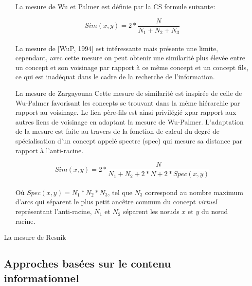 \begin{appendices}
\begin{itemize}
    La mesure de Wu et Palmer est définie par la CS formule suivante:
  
    \begin{equation}
      \label{wu_palmer}
      Sim(x,y) = 2 *  \frac{N}{N_{1} + N_{2} + N_{3}}
    \end{equation}\\

    La mesure de [WuP, 1994] est intéressante mais présente une
    limite, cependant, avec cette mesure on peut obtenir une
    similarité plus élevée entre un concept et son voisinage par
    rapport à ce même concept et un concept fils, ce qui est inadéquat
    dans le cadre de la recherche de l’information.\\

  \item [La mesure de Zargayouna]
    Cette mesure de similarité est inspirée de celle de Wu-Palmer
    favorisant les concepts se trouvant dans la même hiérarchie par
    rapport au voisinage. Le lien père-fils est ainsi privilégié xpar
    rapport aux autres liens de voisinage en adaptant la mesure de
    Wu-Palmer. L'adaptation de la mesure est faite au travers de la
    fonction de calcul du degré de spécialisation d'un concept appelé
    spectre (spec) qui mesure sa distance par rapport à l'anti-racine.

    \begin{equation}
      \label{zargayouna}
      Sim(x,y)= 2 * \frac{N}{N_{1} + N_{2} + 2 * N + 2 * Spec(x,y)}
    \end{equation}\\
      
    Où $Spec(x,y)=N_{1}*N_{2} *N_{3}$, tel que $N_{3}$ correspond au
    nombre maximum d'arcs qui séparent le plus petit ancêtre commun du
    concept \textit{virtuel} représentant l'anti-racine, $N_{1}$ et
    $N_{2}$ séparent les nœuds $x$ et $y$ du nœud racine.\\
  \end{itemize}



  

  



  



  La mesure de Resnik


  \subsection{Approches basées sur le contenu informationnel}
  \label{sec:semantic-sim:ci}


\end{appendices}
